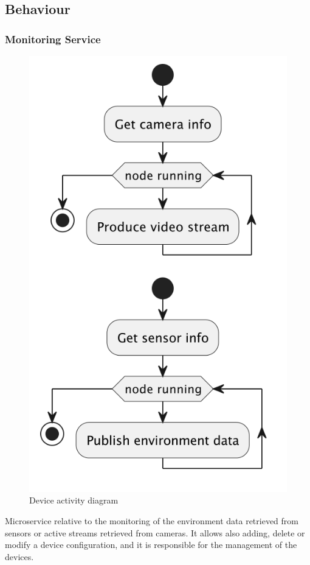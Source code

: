 \documentclass{scrartcl}
\begin{document}
    \subsection{Behaviour}

    \subsubsection{Monitoring Service}
    \begin{figure}
        \centering
        \includegraphics[scale=0.4]{img/device-activity}
        \caption{Device activity diagram}
        \label{fig:device-activity}
    \end{figure}
    Microservice relative to the monitoring of the environment data retrieved from sensors or active streams retrieved from cameras.
    It allows also adding, delete or modify a device configuration, and it is responsible for the management of the devices.
\end{document}
